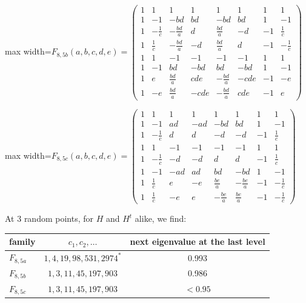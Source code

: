 \documentclass[11pt]{amsart}
\begin{document}
\begin{center}\normalsize\setlength{\arraycolsep}{3.8pt}
\begin{adjustbox}{max width=\textwidth}$\displaystyle F_{8,5b}(a,b,c,d,e)=\begin{pmatrix}
1 & 1 & 1 & 1 & 1 & 1 & 1 & 1 \\
1 & -1 & -bd & bd & -bd & bd & 1 & -1 \\
1 & -\frac{1}{c} & -\frac{bd}{a} & d & \frac{bd}{a} & -d & -1 & \frac{1}{c} \\
1 & \frac{1}{c} & -\frac{bd}{a} & -d & \frac{bd}{a} & d & -1 & -\frac{1}{c} \\
1 & 1 & -1 & -1 & -1 & -1 & 1 & 1 \\
1 & -1 & bd & -bd & bd & -bd & 1 & -1 \\
1 & e & \frac{bd}{a} & cde & -\frac{bd}{a} & -cde & -1 & -e \\
1 & -e & \frac{bd}{a} & -cde & -\frac{bd}{a} & cde & -1 & e
\end{pmatrix}$\end{adjustbox}
\end{center}

\begin{center}\normalsize\setlength{\arraycolsep}{3.8pt}
\begin{adjustbox}{max width=\textwidth}$\displaystyle F_{8,5c}(a,b,c,d,e)=\begin{pmatrix}
1 & 1 & 1 & 1 & 1 & 1 & 1 & 1 \\
1 & -1 & ad & -ad & -bd & bd & 1 & -1 \\
1 & -\frac{1}{c} & d & d & -d & -d & -1 & \frac{1}{c} \\
1 & 1 & -1 & -1 & -1 & -1 & 1 & 1 \\
1 & -\frac{1}{c} & -d & -d & d & d & -1 & \frac{1}{c} \\
1 & -1 & -ad & ad & bd & -bd & 1 & -1 \\
1 & \frac{1}{c} & e & -e & \frac{be}{a} & -\frac{be}{a} & -1 & -\frac{1}{c} \\
1 & \frac{1}{c} & -e & e & -\frac{be}{a} & \frac{be}{a} & -1 & -\frac{1}{c}
\end{pmatrix}$\end{adjustbox}
\end{center}

\noindent At 3 random points, for $H$ and $H^t$ alike, we find:

\medskip

\begin{center}
\begin{tabular}{lcc}
\toprule
family & $c_1,c_2,\ldots$ & next eigenvalue at the last level\\
\midrule
$F_{8,5a}$ & $1,4,19,98,531,2974^*$ & 0.993\\
$F_{8,5b}$ & $1,3,11,45,197,903$ & 0.986\\
$F_{8,5c}$ & $1,3,11,45,197,903$ & $<0.95$\\
\bottomrule
\end{tabular}
\end{center}
\end{document}
